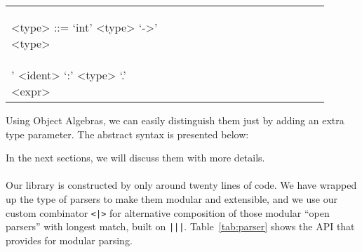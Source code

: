 \begin{tabular}{m{0.45\linewidth}m{0.45\linewidth}}
\setlength{\grammarindent}{5em}
\begin{grammar}
<type> ::= `int' \alt <type> `->' <type>
\end{grammar}
&
\setlength{\grammarindent}{5em}
\begin{grammar}
<expr> ::=  `\\' <ident> `:' <type> `.' <expr>
\end{grammar}
\end{tabular}

Using Object Algebras, we can easily distinguish them just by adding an extra type parameter. The abstract syntax is
presented below:

In the next sections, we will discuss them with more details.

\paragraph{\name} Our library is constructed by only around twenty lines of code. We have wrapped up the type of parsers
to make them modular and extensible, and we use our custom combinator \lstinline{<|>} for alternative composition of those
modular ``open parsers'' with longest match, built on \lstinline{|||}. Table~\ref{tab:parser} shows the API that \name provides for modular parsing.